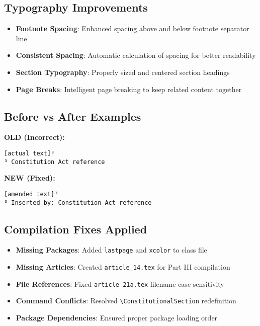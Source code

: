 \documentclass[showamendments,twoside]{soi}
\begin{document}
\subsection*{Typography Improvements}
\begin{itemize}
\item \textbf{Footnote Spacing}: Enhanced spacing above and below footnote separator line
\item \textbf{Consistent Spacing}: Automatic calculation of spacing for better readability
\item \textbf{Section Typography}: Properly sized and centered section headings  
\item \textbf{Page Breaks}: Intelligent page breaking to keep related content together
\end{itemize}

\subsection*{Before vs After Examples}

\textbf{OLD (Incorrect):}
\begin{verbatim}
[actual text]³
³ Constitution Act reference
\end{verbatim}

\textbf{NEW (Fixed):}
\begin{verbatim}
[amended text]³
³ Inserted by: Constitution Act reference
\end{verbatim}

\subsection*{Compilation Fixes Applied}
\begin{itemize}
\item \textbf{Missing Packages}: Added \texttt{lastpage} and \texttt{xcolor} to class file
\item \textbf{Missing Articles}: Created \texttt{article\_14.tex} for Part III compilation
\item \textbf{File References}: Fixed \texttt{article\_21a.tex} filename case sensitivity
\item \textbf{Command Conflicts}: Resolved \texttt{\textbackslash{}ConstitutionalSection} redefinition
\item \textbf{Package Dependencies}: Ensured proper package loading order
\end{itemize}
\end{document}
